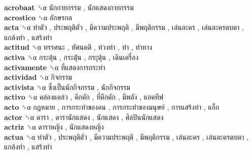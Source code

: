 \textbf{acrobaat} ␝α   นักกายกรรม ,  นักแสดงกายกรรม   \\
\textbf{acrostico} ␝α   อักษรกล   \\
\textbf{acta} ␝α   ทำตัว ,  ประพฤติตัว ,  มีความประพฤติ ,  มีพฤติกรรม ,  เล่นละคร ,  เล่นละครตบตา ,  แกล้งทำ ,  แสร้งทำ   \\
\textbf{actitud} ␝α   ทรรศนะ ,  ทัศนคติ ,  ท่วงท่า ,  ท่า ,  ท่าทาง   \\
\textbf{activa} ␝α   กระตุ้น ,  กระตุ้่น ,  กระุตุ้น ,  เดินเครื่อง   \\
\textbf{activamente} ␝α   ที่แสดงการกระทำ   \\
\textbf{actividad} ␝α   กิจกรรม   \\
\textbf{activista} ␝α   ซึ่งเป็นนักกิจกรรม ,  นักกิจกรรม   \\
\textbf{activo} ␝α   คล่องแคล่ว ,  คึกคัก ,  ที่คึกคัก ,  มีพลัง ,  แอคทีฟ   \\
\textbf{acto} ␝α   กฎหมาย ,  การกระทำของคน ,  การกระทำของมนุษย์ ,  การแสร้งทำ ,  แอ็ก   \\
\textbf{actor} ␝α   ดารา ,  ดารานักแสดง ,  นักแสดง ,  ศิลปินนักแสดง   \\
\textbf{actriz} ␝α   ดาราหญิง ,  นักแสดงหญิง   \\
\textbf{actua} ␝α   ทำตัว ,  ประพฤติตัว ,  มีความประพฤติ ,  มีพฤติกรรม ,  เล่นละคร ,  เล่นละครตบตา ,  แกล้งทำ ,  แสร้งทำ   \\
